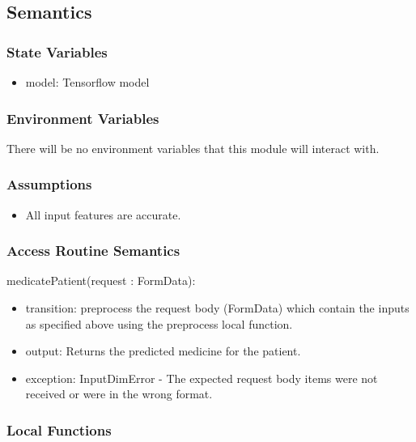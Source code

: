 \documentclass[12pt, titlepage]{article}
\begin{document}
\subsection{Semantics}

\subsubsection{State Variables}


\begin{itemize}
  \item model: Tensorflow model
\end{itemize}

\subsubsection{Environment Variables}

There will be no environment variables that this module will interact with.

\subsubsection{Assumptions}


\begin{itemize}
  \item All input features are accurate.
\end{itemize}

\subsubsection{Access Routine Semantics}



\noindent medicatePatient(request : FormData):
\begin{itemize}
\item transition: preprocess the request body (FormData) which contain the inputs as specified above using the preprocess local function. 
\item output: Returns the predicted medicine for the patient.
\item exception: InputDimError - The expected request body items were not received or were in the wrong format.
\end{itemize}


\subsubsection{Local Functions}
\end{document}
